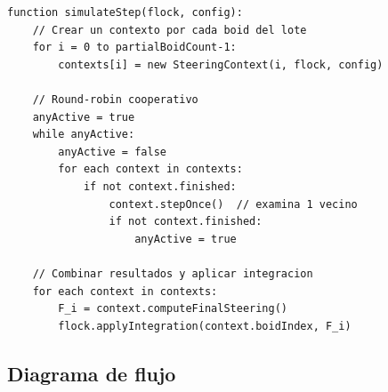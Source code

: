 \documentclass[11pt,a4paper]{article}
\begin{document}
\begin{tcolorbox}[title=Pseudocódigo — Fine-Grained]
\begin{lstlisting}[language={},basicstyle=\ttfamily\small,numbers=none]
function simulateStep(flock, config):
    // Crear un contexto por cada boid del lote
    for i = 0 to partialBoidCount-1:
        contexts[i] = new SteeringContext(i, flock, config)
    
    // Round-robin cooperativo
    anyActive = true
    while anyActive:
        anyActive = false
        for each context in contexts:
            if not context.finished:
                context.stepOnce()  // examina 1 vecino
                if not context.finished:
                    anyActive = true
    
    // Combinar resultados y aplicar integracion
    for each context in contexts:
        F_i = context.computeFinalSteering()
        flock.applyIntegration(context.boidIndex, F_i)
\end{lstlisting}
\end{tcolorbox}

\subsection{Diagrama de flujo}
\end{document}
